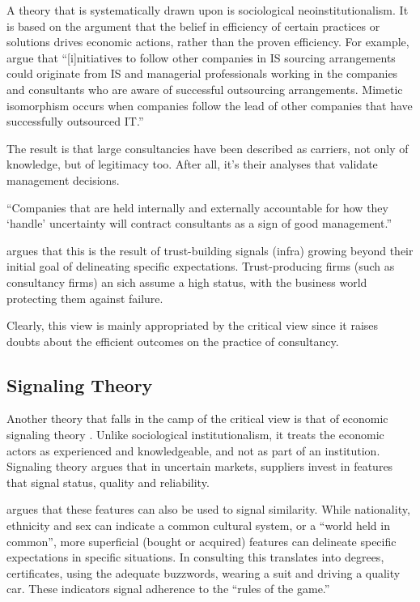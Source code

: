 \documentclass[12pt]{article}
\begin{document}
A theory that is systematically drawn upon \citep[ 6-8]{armbruster2006}
is sociological neoinstitutionalism. It is based on the argument that
the belief in efficiency of certain practices or solutions drives
economic actions, rather than the proven efficiency. For example,
\citet[120]{jayatilaka2006} argue that ``{[}i{]}nitiatives to follow
other companies in IS sourcing arrangements could originate from IS and
managerial professionals working in the companies and consultants who
are aware of successful outsourcing arrangements. Mimetic isomorphism
occurs when companies follow the lead of other companies that have
successfully outsourced IT.''

The result is that large consultancies have been described as carriers,
not only of knowledge, but of legitimacy too. After all, it's their
analyses that validate management decisions.

``Companies that are held internally and externally accountable for how
they `handle' uncertainty will contract consultants as a sign of good
management.'' \citep[ 69]{kieser2006}

\citet[20-21]{zucker1985} argues that this is the result of
trust-building signals (infra) growing beyond their initial goal of
delineating specific expectations. Trust-producing firms (such as
consultancy firms) an sich assume a high status, with the business world
protecting them against failure.

Clearly, this view is mainly appropriated by the critical view since it
raises doubts about the efficient outcomes on the practice of
consultancy.

\hypertarget{signaling-theory}{%
\subsection{Signaling Theory}\label{signaling-theory}}

Another theory that falls in the camp of the critical view is that of
economic signaling theory \citep[ 8-10]{armbruster2006}. Unlike
sociological institutionalism, it treats the economic actors as
experienced and knowledgeable, and not as part of an institution.
Signaling theory argues that in uncertain markets, suppliers invest in
features that signal status, quality and reliability.

\citet[15-16]{zucker1985} argues that these features can also be used to
signal similarity. While nationality, ethnicity and sex can indicate a
common cultural system, or a ``world held in common'', more superficial
(bought or acquired) features can delineate specific expectations in
specific situations. In consulting this translates into degrees,
certificates, using the adequate buzzwords, wearing a suit and driving a
quality car. These indicators signal adherence to the ``rules of the
game.''
\end{document}
